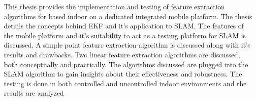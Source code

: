 {}
{
This thesis provides the implementation and testing of feature extraction algorithms for \ekf based indoor \slam on a dedicated integrated mobile platform. The thesis details the concepts behind EKF and it's application to SLAM. The features of the mobile platform and it's suitability to act as a testing platform for SLAM is discussed. A simple point feature extraction algorithm is discussed along with it's results and drawbacks. Two linear feature extraction algorithms are discussed, both conceptually and practically. The algorithms discussed are plugged into the SLAM algorithm to gain insights about their effectiveness and robustness. The testing is done in both controlled and uncontrolled indoor environments and the results are analyzed
}
{\endmsabstract}
